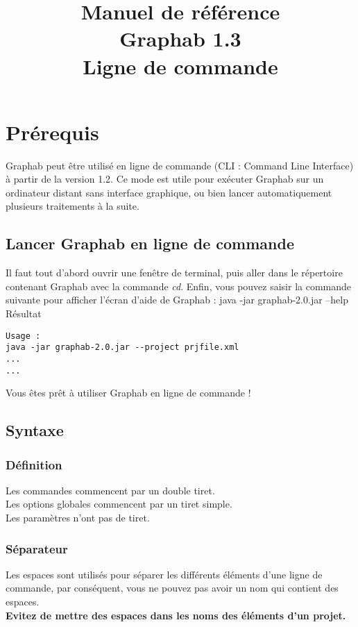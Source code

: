 \documentclass[a4paper,10pt]{report}
\title{Manuel de référence\\
Graphab 1.3\\
Ligne de commande}
\newenvironment{cmd}
{\quote\Verbatim}
{\endVerbatim\endquote}
\begin{document}
\maketitle


\parindent 0pt

\tableofcontents

\chapter{Prérequis}

Graphab peut être utilisé en ligne de commande (CLI : Command Line Interface) à partir de la version 1.2.
Ce mode est utile pour exécuter Graphab sur un ordinateur distant sans interface graphique, ou bien lancer automatiquement plusieurs traitements à la suite.

\section{Lancer Graphab en ligne de commande}
Il faut tout d'abord ouvrir une fenêtre de terminal, puis aller dans le répertoire contenant Graphab avec la commande \textit{cd}.
Enfin, vous pouvez saisir la commande suivante pour afficher l'écran d'aide de Graphab :
\begin{cmd}
java -jar graphab-2.0.jar --help
\end{cmd}
Résultat
\begin{verbatim}
Usage :
java -jar graphab-2.0.jar --project prjfile.xml
...
...
\end{verbatim}
Vous êtes prêt à utiliser Graphab en ligne de commande !

\section{Syntaxe}
\subsection{Définition}
Les commandes commencent par un double tiret.\\
Les options globales commencent par un tiret simple.\\
Les paramètres n'ont pas de tiret.
\subsection{Séparateur}
Les espaces sont utilisés pour séparer les différents éléments d'une ligne de commande, par conséquent, vous ne pouvez pas avoir un nom qui contient des espaces.\\
\textbf{Evitez de mettre des espaces dans les noms des éléments d'un projet.}
\end{document}
